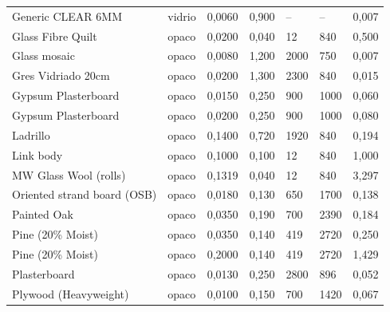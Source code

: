 {\begin{longtable}{p{3.2cm}p{1.9cm}p{1.4cm}p{1.6cm}p{1.5cm}p{1.7cm}p{1.5cm}}
  Generic CLEAR 6MM & vidrio & 0,0060 & 0,900 & -- & -- & 0,007 \\
  Glass Fibre Quilt & opaco & 0,0200 & 0,040 & 12 & 840 & 0,500 \\
  Glass mosaic & opaco & 0,0080 & 1,200 & 2000 & 750 & 0,007 \\
  Gres Vidriado 20cm & opaco & 0,0200 & 1,300 & 2300 & 840 & 0,015 \\
  Gypsum Plasterboard & opaco & 0,0150 & 0,250 & 900 & 1000 & 0,060 \\
  Gypsum Plasterboard & opaco & 0,0200 & 0,250 & 900 & 1000 & 0,080 \\
  Ladrillo & opaco & 0,1400 & 0,720 & 1920 & 840 & 0,194 \\
  Link body & opaco & 0,1000 & 0,100 & 12 & 840 & 1,000 \\
  MW Glass Wool (rolls) & opaco & 0,1319 & 0,040 & 12 & 840 & 3,297 \\
  Oriented strand board (OSB) & opaco & 0,0180 & 0,130 & 650 & 1700 & 0,138 \\
  Painted Oak & opaco & 0,0350 & 0,190 & 700 & 2390 & 0,184 \\
  Pine (20\% Moist) & opaco & 0,0350 & 0,140 & 419 & 2720 & 0,250 \\
  Pine (20\% Moist) & opaco & 0,2000 & 0,140 & 419 & 2720 & 1,429 \\
  Plasterboard & opaco & 0,0130 & 0,250 & 2800 & 896 & 0,052 \\
  Plywood (Heavyweight) & opaco & 0,0100 & 0,150 & 700 & 1420 & 0,067 \\
\end{longtable}
}
